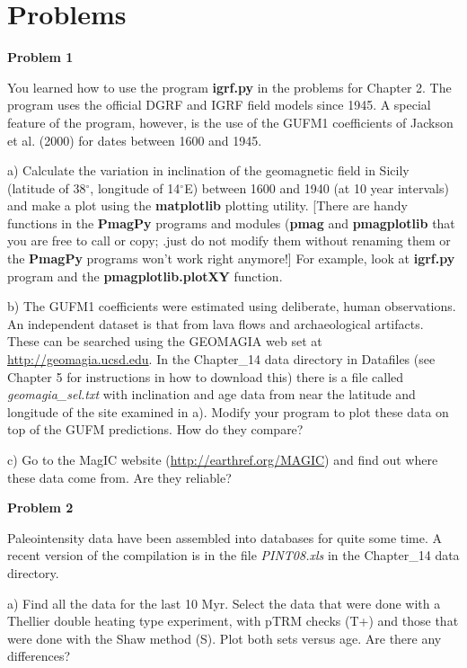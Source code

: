 \section{Problems}
{\parindent 0pt  \parskip 12pt
{\bf Problem 1}   

You learned how to use the program {\bf igrf.py} in the problems for Chapter 2. The program uses the official DGRF and IGRF field models since 1945.  A special feature of the program, however, is the use of the GUFM1 coefficients of 
 \nocite{jackson00}
Jackson et al. (2000) for dates between 1600 and 1945.  

a) Calculate the variation in inclination of the geomagnetic field in Sicily (latitude of 38$^{\circ}$, longitude of 14$^{\circ}$E) between 1600 and 1940 (at 10 year intervals) and make a plot using the {\bf matplotlib} plotting utility.  [There are handy  functions in the {\bf PmagPy} programs and modules ({\bf pmag} and {\bf pmagplotlib} that you are free to call or copy; .just do not modify them without renaming them or the {\bf PmagPy} programs won't work right anymore!]   For example, look at {\bf igrf.py} program and  the {\bf pmagplotlib.plotXY} function.

b)  The GUFM1 coefficients were estimated using deliberate, human observations.   An independent dataset is that from lava flows and archaeological artifacts.  These can be searched using the GEOMAGIA web set at \url{http://geomagia.ucsd.edu}.
In the Chapter\_14 data directory in Datafiles (see Chapter 5 for instructions in how to download this) there is a file called {\it geomagia\_sel.txt} with inclination and age data from near the latitude and longitude  of the site examined in a).     Modify your program to plot these data on top of the GUFM predictions.  How do they compare?  

c) Go to the MagIC website (\url{http://earthref.org/MAGIC}) and find out where these data come from.  Are they reliable?  

{\bf Problem 2}


Paleointensity data have been assembled into databases for quite some time.  A recent version of the compilation is in the file {\it PINT08.xls} in the Chapter\_14 data directory.  

a)  Find all the data for the last 10 Myr.  
Select the data that were done with a Thellier double heating type experiment, with pTRM checks (T+) and those that were done with the Shaw method (S).   Plot both sets versus age.  Are there any differences?  

}
